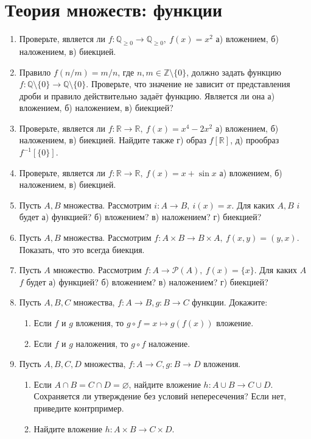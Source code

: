 \documentclass{article}
\newcommand{\Z}{\mathbb{Z}}
\newcommand{\Q}{\mathbb{Q}}
\newcommand{\R}{\mathbb{R}}
\begin{document}
\section{Теория множеств: функции}
\begin{enumerate}
    \item Проверьте, является ли $f: \Q_{\geq 0} \to \Q_{\geq 0},~f(x)=x^2$ а) вложением, б) наложением, в) биекцией.
    \item Правило $f(n/m)=m/n$, где $n,m\in\Z\setminus\{0\}$, должно задать функцию $f:\Q\setminus\{0\}\to\Q\setminus\{0\}$. Проверьте, что значение не зависит от представления дроби и правило действительно задаёт функцию. Является ли она а) вложением, б) наложением, в) биекцией?
    \item Проверьте, является ли $f: \R \to \R,~f(x)=x^4-2x^2$ а) вложением, б) наложением, в) биекцией. Найдите также г) образ $f[\R]$, д) прообраз $f^{-1}[\{0\}]$.
    \item Проверьте, является ли $f: \R \to \R,~f(x)=x + \sin x$ а) вложением, б) наложением, в) биекцией.
    \item Пусть $A, B$ множества. Рассмотрим $i: A \to B,~i(x)=x$. Для каких $A,B$ $i$ будет а) функцией? б) вложением? в) наложением? г) биекцией?
    \item Пусть $A, B$ множества. Рассмотрим $f: A \times B \to B \times A,~f(x,y)=(y,x)$. Показать, что это всегда биекция.
    \item Пусть $A$ множество. Рассмотрим $f: A \to \mathcal{P}(A),~f(x)=\{x\}$. Для каких $A$ $f$ будет а) функцией? б) вложением? в) наложением? г) биекцией?
    \item Пусть $A,B,C$ множества, $f: A \to B, g: B \to C$ функции. Докажите:
        \begin{enumerate}
            \item Если $f$ и $g$ вложения, то $g \circ f = x \mapsto g(f(x))$ вложение.
            \item Если $f$ и $g$ наложения, то $g \circ f$ наложение.
        \end{enumerate}
    \item Пусть $A,B,C,D$ множества, $f: A \to C, g: B \to D$ вложения.
        \begin{enumerate}
            \item Если $A \cap B = C \cap D = \varnothing$, найдите вложение $h: A \cup B \to C \cup D$. Сохраняется ли утверждение без условий непересечения? Если нет, приведите контрпример.
            \item Найдите вложение $h: A \times B \to C \times D$.

\end{enumerate}
\end{enumerate}
\end{document}
